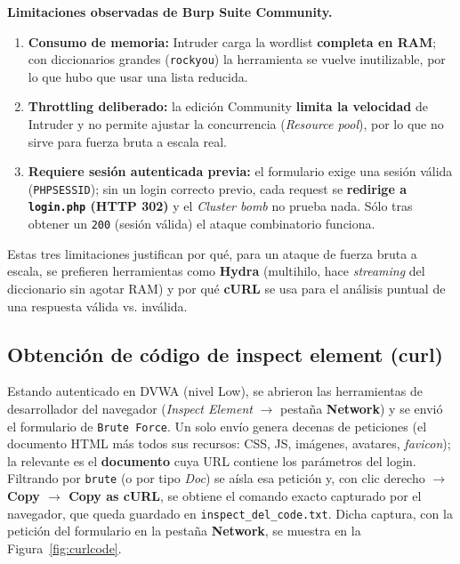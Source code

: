\documentclass[letter,12pt]{article}
\begin{document}
\textbf{Limitaciones observadas de Burp Suite Community.}

\begin{enumerate}
    \item \textbf{Consumo de memoria:} Intruder carga la wordlist \textbf{completa en RAM}; con diccionarios grandes (\texttt{rockyou}) la herramienta se vuelve inutilizable, por lo que hubo que usar una lista reducida.
    \item \textbf{Throttling deliberado:} la edición Community \textbf{limita la velocidad} de Intruder y no permite ajustar la concurrencia (\emph{Resource pool}), por lo que no sirve para fuerza bruta a escala real.
    \item \textbf{Requiere sesión autenticada previa:} el formulario exige una sesión válida (\texttt{PHPSESSID}); sin un login correcto previo, cada request se \textbf{redirige a \texttt{login.php} (HTTP 302)} y el \emph{Cluster bomb} no prueba nada. Sólo tras obtener un \texttt{200} (sesión válida) el ataque combinatorio funciona.
\end{enumerate}

Estas tres limitaciones justifican por qué, para un ataque de fuerza bruta a escala, se prefieren herramientas como \textbf{Hydra} (multihilo, hace \emph{streaming} del diccionario sin agotar RAM) y por qué \textbf{cURL} se usa para el análisis puntual de una respuesta válida vs. inválida. \\


\subsection{Obtención de código de inspect element (curl)}
Estando autenticado en DVWA (nivel Low), se abrieron las herramientas de desarrollador del navegador (\emph{Inspect Element} $\rightarrow$ pestaña \textbf{Network}) y se envió el formulario de \texttt{Brute Force}. Un solo envío genera decenas de peticiones (el documento HTML más todos sus recursos: CSS, JS, imágenes, avatares, \emph{favicon}); la relevante es el \textbf{documento} cuya URL contiene los parámetros del login. Filtrando por \texttt{brute} (o por tipo \emph{Doc}) se aísla esa petición y, con clic derecho $\rightarrow$ \textbf{Copy $\rightarrow$ Copy as cURL}, se obtiene el comando exacto capturado por el navegador, que queda guardado en \texttt{inspect\_del\_code.txt}. Dicha captura, con la petición del formulario en la pestaña \textbf{Network}, se muestra en la Figura~\ref{fig:curlcode}. \\
\end{document}
